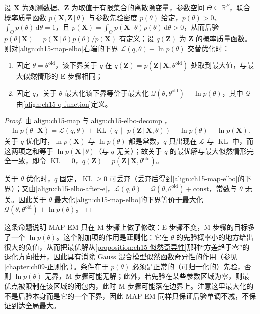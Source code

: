 \documentclass[../../main.tex]{subfiles}
\begin{document}
\begin{proposition}\label{proposition:ch15-MAP-EM}
设 $\bm{X}$ 为观测数据、$\bm{Z}$ 为取值于有限集合的离散隐变量，参数空间 $\Theta\subseteq\mathbb{R}^{P}$，联合概率质量函数 $p(\bm{X},\bm{Z}\,|\,\theta)$ 与参数先验密度 $p(\theta)$ 给定，$p(\theta)>0$、$\int_{\Theta}p(\theta)\,\mathrm{d}\theta=1$，且 $p(\bm{X})=\int_{\Theta}p(\bm{X}\,|\,\theta)p(\theta)\,\mathrm{d}\theta>0$，从而后验 $p(\theta\,|\,\bm{X})=p(\bm{X}\,|\,\theta)p(\theta)/p(\bm{X})$ 有定义；设 $q(\bm{Z})$ 为 $\bm{Z}$ 的概率质量函数。则对\eqref{align:ch15-map-elbo}右端的下界 $\mathcal{L}(q,\theta)+\ln p(\theta)$ 交替优化时：
\begin{enumerate}
\item 固定 $\theta=\theta^{\text{old}}$，该下界关于 $q$ 在 $q(\bm{Z})=p(\bm{Z}\,|\,\bm{X},\theta^{\text{old}})$ 处取到最大值，与最大似然情形的 E 步骤相同；
\item 固定 $q$，关于 $\theta$ 最大化该下界等价于最大化 $\mathcal{Q}(\theta,\theta^{\text{old}})+\ln p(\theta)$，其中 $\mathcal{Q}$ 由\eqref{align:ch15-q-function}定义。
\end{enumerate}
\end{proposition}
\begin{proof}
由\eqref{align:ch15-map}与\eqref{align:ch15-elbo-decomp}，
\begin{align*}
\ln p(\theta\,|\,\bm{X})=\mathcal{L}(q,\theta)+\operatorname{KL}\!\left(q\,\|\,p(\bm{Z}\,|\,\bm{X},\theta)\right)+\ln p(\theta)-\ln p(\bm{X}).
\end{align*}
关于 $q$ 优化时，$\ln p(\bm{X})$ 与 $\ln p(\theta)$ 都是常数，$q$ 只出现在 $\mathcal{L}$ 与 $\operatorname{KL}$ 中，而这两项之和等于 $\ln p(\bm{X}\,|\,\theta)$（与 $q$ 无关）；故关于 $q$ 的最优解与最大似然情形完全一致，即令 $\operatorname{KL}=0$，$q(\bm{Z})=p(\bm{Z}\,|\,\bm{X},\theta^{\text{old}})$。

关于 $\theta$ 优化时，$q$ 固定，$\operatorname{KL}\geqslant0$ 可丢弃（丢弃后得到\eqref{align:ch15-map-elbo}的下界）；又由\eqref{align:ch15-elbo-after-e}，$\mathcal{L}(q,\theta)=\mathcal{Q}(\theta,\theta^{\text{old}})+\text{const}$，常数与 $\theta$ 无关。因此关于 $\theta$ 最大化\eqref{align:ch15-map-elbo}的下界等价于最大化 $\mathcal{Q}(\theta,\theta^{\text{old}})+\ln p(\theta)$。
\end{proof}

\begin{remark}
这条命题说明 MAP-EM 只在 M 步骤上做了修改：E 步骤不变，M 步骤的目标多了一个 $\ln p(\theta)$。这个附加项的作用是\textbf{正则化}：它在 $\theta$ 的先验概率小的地方给出很大的负值，从而把最优解从\cref{proposition:ch15-似然奇异性}那种“方差趋于零”的退化方向推开，因此具有消除 Gauss 混合模型似然函数奇异性的作用（参见\cref{chapter:ch09-正则化}）。条件在于 $p(\theta)$ 必须是正常的（可归一化的）先验，否则 $\ln p(\theta)$ 无界，M 步骤可能无解；此外，若先验在某些参数区域为零，则最优点被限制在该区域的闭包内，此时 M 步骤可能落在边界上。注意这里最大化的不是后验本身而是它的一个下界，因此 MAP-EM 同样只保证后验单调不减，不保证到达全局最大。
\end{remark}
\end{document}

